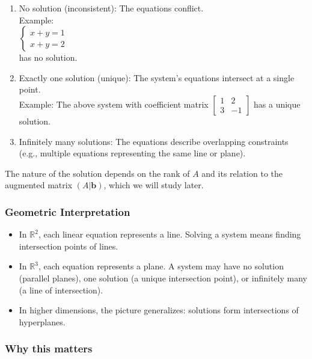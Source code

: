\documentclass[
  12pt,
  a4paper,
]{article}
\begin{document}
\begin{enumerate}
\def\labelenumi{\arabic{enumi}.}
\item
  No solution (inconsistent): The equations conflict.\\
  Example:\\
  \(
  \begin{cases}
  x + y = 1 \\
  x + y = 2
  \end{cases}
  \)\\
  has no solution.
\item
  Exactly one solution (unique): The system's equations intersect at a
  single point.\\
  Example: The above system with coefficient matrix \(
  \begin{bmatrix} 1 & 2 \\ 3 & -1 \end{bmatrix}
  \) has a unique solution.
\item
  Infinitely many solutions: The equations describe overlapping
  constraints (e.g., multiple equations representing the same line or
  plane).
\end{enumerate}

The nature of the solution depends on the rank of \(A\) and its relation
to the augmented matrix \((A|\mathbf{b})\), which we will study later.

\subsubsection{Geometric
Interpretation}\label{geometric-interpretation-2}

\begin{itemize}
\item
  In \(\mathbb{R}^2\), each linear equation represents a line. Solving a
  system means finding intersection points of lines.
\item
  In \(\mathbb{R}^3\), each equation represents a plane. A system may
  have no solution (parallel planes), one solution (a unique
  intersection point), or infinitely many (a line of intersection).
\item
  In higher dimensions, the picture generalizes: solutions form
  intersections of hyperplanes.
\end{itemize}

\subsubsection{Why this matters}\label{why-this-matters-8}
\end{document}
